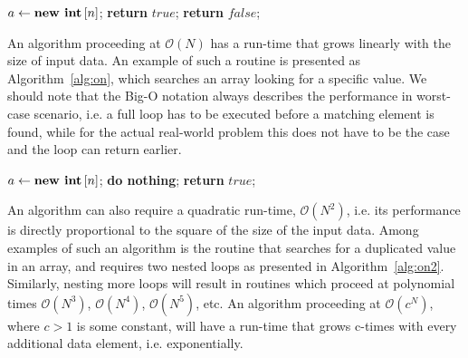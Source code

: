 \begin{algorithm}[h!]
\centering
\begin{algorithmic}[1]
\State $a \gets \text{\textbf{new int}}\left[n\right]$;
%
%
%
\State \textbf{return} $true$;
%
\Else 
%
\State \textbf{return} $false$;
%
\EndIf
%
\EndFor
\end{algorithmic}
\caption{
{ \footnotesize 
{\bf Search for a value.} 
}%
}
\label{alg:on}
\end{algorithm}

An algorithm proceeding at $\mathcal{O}\left(N\right)$ has a run-time that grows linearly with the size of input data.
An example of such a routine is presented as Algorithm~\ref{alg:on}, which searches an array looking for a specific value.
We should note that the Big-O notation always describes the performance in worst-case scenario, i.e. a full loop has to be executed before a matching element is found, while for the actual real-world problem this does not have to be the case and the loop can return earlier.

\begin{algorithm}[h!]
\centering
\begin{algorithmic}[1]
\State $a \gets \text{\textbf{new int}}\left[n\right]$;
%
%
%
%
\State \textbf{do nothing};
%
\Else 
%
%
\State \textbf{return} $true$;
%
\EndIf
%
\EndIf {}
%
\EndFor {}
%
\EndFor {}
\end{algorithmic}
\caption{
{ \footnotesize 
{\bf Search for the first duplicated value.} 
}%
}
\label{alg:on2}
\end{algorithm}

An algorithm can also require a quadratic run-time, $\mathcal{O}\left(N^2\right)$, i.e. its performance is directly proportional to the square of the size of the input data.
Among examples of such an algorithm is the routine that searches for a duplicated value in an array, and requires two nested loops as presented in Algorithm~\ref{alg:on2}.
Similarly, nesting more loops will result in routines which proceed at polynomial times $\mathcal{O}\left(N^3\right)$, $\mathcal{O}\left(N^4\right)$, $\mathcal{O}\left(N^5\right)$, etc.
An algorithm proceeding at $\mathcal{O}\left(c^N\right)$, where $c>1$ is some constant, will have a run-time that grows c-times with every additional data element, i.e. exponentially. 

